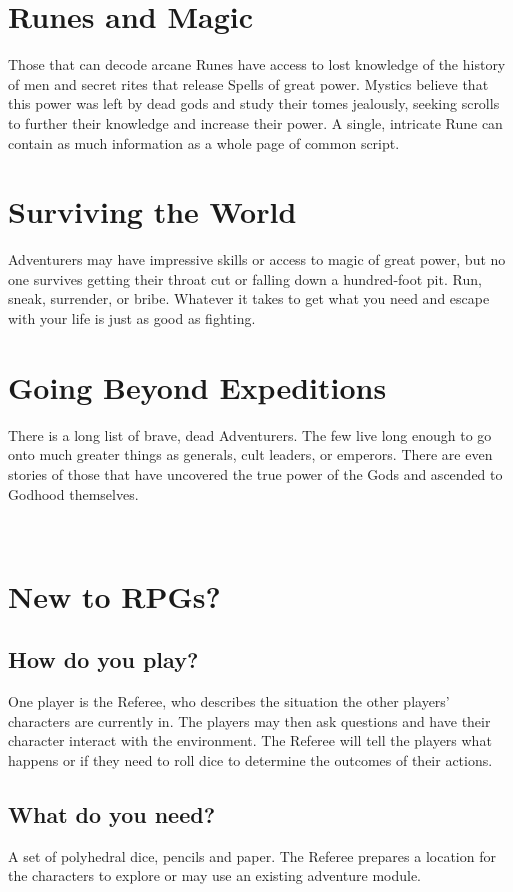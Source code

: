 \documentclass[itdr]{subfiles}
\begin{document}
\section*{Runes and Magic}

Those that can decode arcane Runes have access to lost knowledge of the history of men and secret rites that release Spells of great power. Mystics believe that this power was left by dead gods and study their tomes jealously, seeking scrolls to further their knowledge and increase their power. A single, intricate Rune can contain as much information as a whole page of common script.

\vfill
\break

\section*{Surviving the World}

Adventurers may have impressive skills or access to magic of great power, but no one survives getting their throat cut or falling down a hundred-foot pit. Run, sneak, surrender, or bribe. Whatever it takes to get what you need and escape with your life is just as good as fighting.

\section*{Going Beyond Expeditions}

There is a long list of brave, dead Adventurers. The few live long enough to go onto much greater things as generals, cult leaders, or emperors. There are even stories of those that have uncovered the true power of the Gods and ascended to Godhood themselves.

~\\

\section*{New to RPGs?}

\subsection*{How do you play?}
One player is the Referee, who describes the situation the other players' characters are currently in. The players may then ask questions and have their character interact with the environment. The Referee will tell the players what happens or if they need to roll dice to determine the outcomes of their actions.

\subsection*{What do you need?}
A set of polyhedral dice, pencils and paper. The Referee prepares a location for the characters to explore or may use an existing adventure module.
\end{document}
